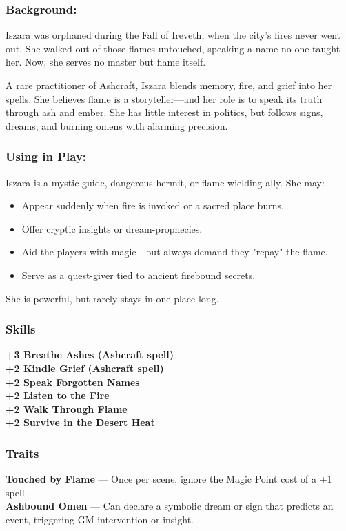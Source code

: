 \begin{paracol}{3}
    \subsubsection*{Background:}
    Iszara was orphaned during the Fall of Ireveth, when the city’s fires never went out. She walked out of those flames untouched, speaking a name no one taught her. Now, she serves no master but flame itself.

    A rare practitioner of Ashcraft, Iszara blends memory, fire, and grief into her spells. She believes flame is a storyteller—and her role is to speak its truth through ash and ember. She has little interest in politics, but follows signs, dreams, and burning omens with alarming precision.

    \switchcolumn
    \subsubsection*{Using in Play:}
    Iszara is a mystic guide, dangerous hermit, or flame-wielding ally. She may:
    \begin{itemize}\raggedright
        \item Appear suddenly when fire is invoked or a sacred place burns.
        \item Offer cryptic insights or dream-prophecies.
        \item Aid the players with magic—but always demand they "repay" the flame.
        \item Serve as a quest-giver tied to ancient firebound secrets.
    \end{itemize}

    She is powerful, but rarely stays in one place long.

    \switchcolumn
    \subsubsection{Skills}\raggedright
        \noindent\textbf{+3 Breathe Ashes (Ashcraft spell)} \\
        \noindent\textbf{+2 Kindle Grief (Ashcraft spell)} \\
        \noindent\textbf{+2 Speak Forgotten Names} \\
        \noindent\textbf{+2 Listen to the Fire} \\
        \noindent\textbf{+2 Walk Through Flame} \\
        \noindent\textbf{+2 Survive in the Desert Heat}
    \subsubsection{Traits}
        \textbf{Touched by Flame} — Once per scene, ignore the Magic Point cost of a +1 spell.\\
        \textbf{Ashbound Omen} — Can declare a symbolic dream or sign that predicts an event, triggering GM intervention or insight.
\end{paracol}

